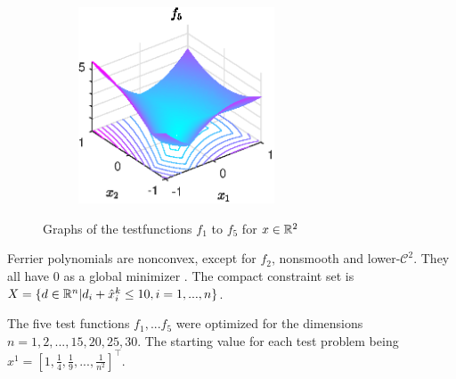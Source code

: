 \begin{figure}[H]
	\begin{subfigure}{0.49\textwidth}
		\includegraphics[width=0.64\textwidth]{Pictures/Plots/testfun_f5}
	\end{subfigure}
	\caption{Graphs of the testfunctions $f_1$ to $f_5$ for $x\in\mathbb{R}^2$}
	\label{fig_ferr_pol}
\end{figure}
Ferrier polynomials are nonconvex, except for \(f_2\), nonsmooth and lower-\(\mathcal{C}^2\). They all have \(0\) as a global minimizer \cite{Hare2010}. The compact constraint set is \(X=\{d \in \mathbb{R}^n|d_i+\hat{x}^k_i \leq 10, i = 1,...,n \}\).

The five test functions \(f_1,...f_5\) were optimized for the dimensions \(n=1,2,...,15,20,25,30\).
The starting value for each test problem being \(x^1=[1,\frac{1}{4},\frac{1}{9},...,\frac{1}{n^2}]^{\top}\).

